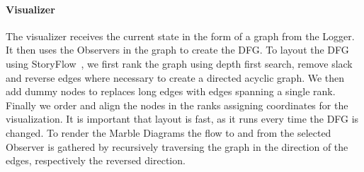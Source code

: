 \paragraph{Visualizer} The visualizer receives the current state in the
form of a graph from the Logger.  It then uses the Observers in the
graph to create the DFG.  To layout the DFG using StoryFlow~\cite{liu2013storyflow},
we first rank the graph using depth first search, remove slack and
reverse edges where necessary to create a directed acyclic graph.  We
then add dummy nodes to replaces long edges with edges spanning a single
rank.  Finally we order and align the nodes in the ranks assigning
coordinates for the visualization.  It is important that layout is fast,
as it runs every time the DFG is changed.  To render the Marble Diagrams
the flow to and from the selected Observer is gathered by recursively
traversing the graph in the direction of the edges, respectively the
reversed direction.
